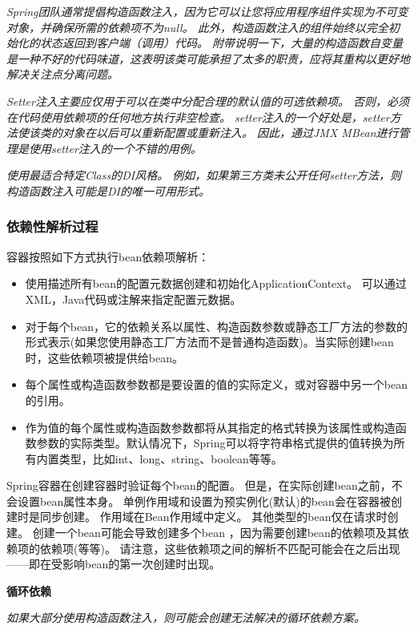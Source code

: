 \textit{Spring团队通常提倡构造函数注入，因为它可以让您将应用程序组件实现为不可变对象，并确保所需的依赖项不为null。 此外，构造函数注入的组件始终以完全初始化的状态返回到客户端（调用）代码。 附带说明一下，大量的构造函数自变量是一种不好的代码味道，这表明该类可能承担了太多的职责，应将其重构以更好地解决关注点分离问题。}

\textit{Setter注入主要应仅用于可以在类中分配合理的默认值的可选依赖项。 否则，必须在代码使用依赖项的任何地方执行非空检查。 setter注入的一个好处是，setter方法使该类的对象在以后可以重新配置或重新注入。 因此，通过JMX MBean进行管理是使用setter注入的一个不错的用例。}

\textit{使用最适合特定Class的DI风格。 例如，如果第三方类未公开任何setter方法，则构造函数注入可能是DI的唯一可用形式。}

\subsubsection{依赖性解析过程}
容器按照如下方式执行bean依赖项解析：

\begin{itemize}
    \item 使用描述所有bean的配置元数据创建和初始化ApplicationContext。 可以通过XML，Java代码或注解来指定配置元数据。
    \item 对于每个bean，它的依赖关系以属性、构造函数参数或静态工厂方法的参数的形式表示(如果您使用静态工厂方法而不是普通构造函数)。当实际创建bean时，这些依赖项被提供给bean。
    \item 每个属性或构造函数参数都是要设置的值的实际定义，或对容器中另一个bean的引用。
    \item 作为值的每个属性或构造函数参数都将从其指定的格式转换为该属性或构造函数参数的实际类型。默认情况下，Spring可以将字符串格式提供的值转换为所有内置类型，比如int、long、string、boolean等等。
\end{itemize}

Spring容器在创建容器时验证每个bean的配置。
但是，在实际创建bean之前，不会设置bean属性本身。
单例作用域和设置为预实例化(默认)的bean会在容器被创建时是同步创建。
作用域在Bean作用域中定义。
其他类型的bean仅在请求时创建。
创建一个bean可能会导致创建多个bean
，因为需要创建bean的依赖项及其依赖项的依赖项(等等)。
请注意，这些依赖项之间的解析不匹配可能会在之后出现——即在受影响bean的第一次创建时出现。

\begin{center}
    \textbf{循环依赖}
\end{center}

\textit{如果大部分使用构造函数注入，则可能会创建无法解决的循环依赖方案。}

